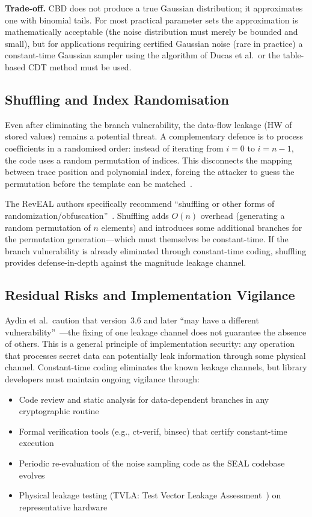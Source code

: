 \documentclass[sigconf,nonacm]{acmart}
\begin{document}
\textbf{Trade-off.} CBD does not produce a true Gaussian distribution; it approximates
one with binomial tails. For most practical parameter sets the approximation is
mathematically acceptable (the noise distribution must merely be bounded and small),
but for applications requiring certified Gaussian noise (rare in practice) a
constant-time Gaussian sampler using the algorithm of Ducas et al.\ or the table-based
CDT method must be used.

\subsection{Shuffling and Index Randomisation}

Even after eliminating the branch vulnerability, the data-flow leakage (HW of stored
values) remains a potential threat. A complementary defence is to process coefficients
in a randomised order: instead of iterating from $i=0$ to $i=n-1$, the code uses a
random permutation of indices. This disconnects the mapping between trace position
and polynomial index, forcing the attacker to guess the permutation before the
template can be matched~\cite{aydin2022reveal}.

The RevEAL authors specifically recommend ``shuffling or other forms of
randomization/obfuscation''~\cite{aydin2022reveal}. Shuffling adds $O(n)$ overhead
(generating a random permutation of $n$ elements) and introduces some additional
branches for the permutation generation---which must themselves be constant-time.
If the branch vulnerability is already eliminated through constant-time coding,
shuffling provides defense-in-depth against the magnitude leakage channel.

\subsection{Residual Risks and Implementation Vigilance}

Aydin et al.\ caution that version~3.6 and later ``may have a different
vulnerability''~\cite{aydin2022reveal}---the fixing of one leakage channel does not
guarantee the absence of others. This is a general principle of implementation
security: any operation that processes secret data can potentially leak information
through some physical channel. Constant-time coding eliminates the known leakage
channels, but library developers must maintain ongoing vigilance through:

\begin{itemize}
  \item Code review and static analysis for data-dependent branches in any
        cryptographic routine
  \item Formal verification tools (e.g., ct-verif, binsec) that certify
        constant-time execution
  \item Periodic re-evaluation of the noise sampling code as the SEAL codebase
        evolves
  \item Physical leakage testing (TVLA: Test Vector Leakage Assessment~\cite{goodwill2011})
        on representative hardware
\end{itemize}
\end{document}
